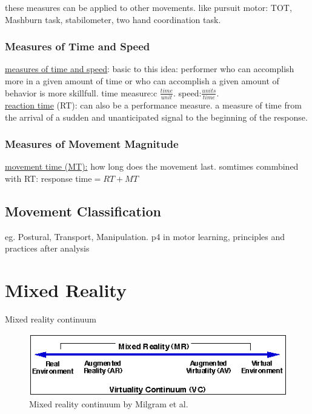 these measures can be applied to other movements. like pursuit motor: TOT, Mashburn task, stabilometer, two hand coordination task.

\subsubsection{Measures of Time and Speed}
\underline{measures of time and speed}: basic to this idea: performer who can accomplish more in a given amount of time or who can accomplish a given amount of behavior is  more skillfull. time measure:c $\frac{time}{unit}$. speed:$\frac{units}{time}$.\\

\underline{reaction time} (RT): can also be a performance measure. a measure of time from the arrival of a sudden and unanticipated signal to the beginning of the response. 
\subsubsection{Measures of Movement Magnitude}
\underline{movement time (MT):} how long does the movement last. somtimes commbined with RT: response time$=RT+MT$

\subsection{Movement Classification}
eg. Postural, Transport, Manipulation. p4 in motor learning, principles and practices
\todo after analysis

\section{Mixed Reality}
Mixed reality continuum \cite{Milgram1994}

\begin{figure}
	\centering
	\includegraphics[width=1.0\textwidth]{img/milgram_continuum.png}
	\caption{Mixed reality continuum by Milgram et al. \cite{Milgram1994}}
	\label{fig:ego-exo-cont}
\end{figure}

